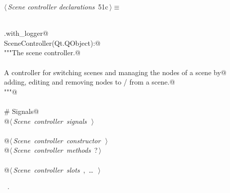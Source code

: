 \documentclass[
    a4paper,      %
    10pt,         %
    openright,    %
    notitlepage,  %
    parskip=half, %
]{scrreprt}       %
\theoremstyle{definition}                    %
\begin{document}
\begin{flushleft} \small
\begin{minipage}{\linewidth}\label{scrap78}\raggedright\small
{} $\langle\,${\itshape Scene controller declarations}\nobreak\ {\footnotesize {51c}}$\,\rangle\equiv$
\vspace{-1exm}
\begin{list}{}{} \item
\mbox{}\lstinline@@\\
\mbox{}\lstinline@common.with_logger@\\
\mbox{}\lstinline@class SceneController(Qt.QObject):@\\
\mbox{}\lstinline@    """The scene controller.@\\
\mbox{}\lstinline@@\\
\mbox{}\lstinline@    A controller for switching scenes and managing the nodes of a scene by@\\
\mbox{}\lstinline@    adding, editing and removing nodes to / from a scene.@\\
\mbox{}\lstinline@    """@\\
\mbox{}\lstinline@@\\
\mbox{}\lstinline@    # Signals@\\
\mbox{}\lstinline@    @\hbox{$\langle\,${\itshape Scene controller signals}\nobreak\ {\footnotesize {}}$\,\rangle$}\lstinline@@\\
\mbox{}\lstinline@@\\
\mbox{}\lstinline@    @\hbox{$\langle\,${\itshape Scene controller constructor}\nobreak\ {\footnotesize {}}$\,\rangle$}\lstinline@@\\
\mbox{}\lstinline@    @\hbox{$\langle\,${\itshape Scene controller methods}\nobreak\ {\footnotesize ?}$\,\rangle$}\lstinline@@\\
\mbox{}\lstinline@@\\
\mbox{}\lstinline@    @\hbox{$\langle\,${\itshape Scene controller slots}\nobreak\ {\footnotesize {}, \ldots\ }$\,\rangle$}\lstinline@@\\
\mbox{}\lstinline@@{\NWsep}
\end{list}
\vspace{-1.5ex}
\footnotesize
\begin{list}{}{\setlength{\itemsep}{-\parsep}\setlength{\itemindent}{-\leftmargin}}
\item \NWtxtMacroRefIn\ .

\item{}
\end{list}
\end{minipage}\vspace{4ex}
\end{flushleft}
\end{document}
